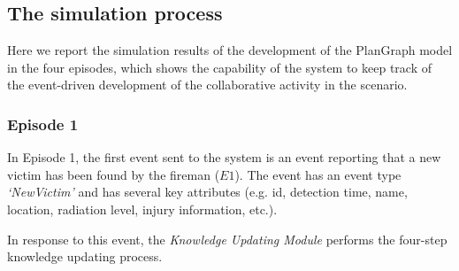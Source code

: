 \subsection{The simulation process} %
\label{sub:the_simulation_process}
Here we report the simulation results of the development of the PlanGraph model in the four episodes, which shows the capability of the system to keep track of the event-driven development of the collaborative activity in the scenario.

\subsubsection{Episode 1} %
\label{ssub:episode_1}
In Episode 1, the first event sent to the system is an event reporting that a new victim has been found by the fireman ($E1$). The event has an event type \emph{`NewVictim'} and has several key attributes (e.g. id, detection time, name, location, radiation level, injury information, etc.). 

In response to this event, the \emph{Knowledge Updating Module} performs the four-step knowledge updating process.

